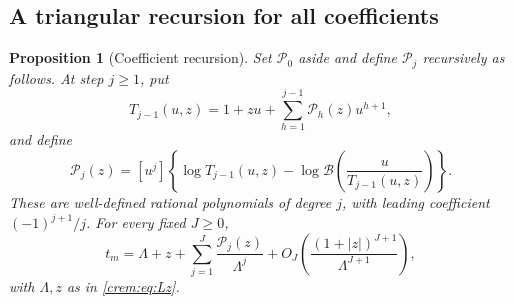 \documentclass[11pt,a4paper]{article}
\newtheorem{proposition}[proposition]{Proposition}
\theoremstyle{definition}\newaliascnt{definition}{theorem}
\theoremstyle{remark}\newaliascnt{remark}{theorem}
\newcommand{\Bformal}{\mathcal B}%
\begin{document}
\subsection{A triangular recursion for all coefficients}
\begin{proposition}[Coefficient recursion]\label{crem:prop:P-recursion}
Set $\mathcal P_0$ aside and define $\mathcal P_j$ recursively as follows.
At step $j\ge1$, put
\[
 T_{j-1}(u,z)=1+zu+\sum_{h=1}^{j-1}\mathcal P_h(z)u^{h+1},
\]
and define
\begin{equation}
 \mathcal P_j(z)=[u^j]\left\{
  \log T_{j-1}(u,z)
  -\log\Bformal\!\left(\frac{u}{T_{j-1}(u,z)}\right)
 \right\}.
 \label{crem:eq:P-recursion}
\end{equation}
These are well-defined rational polynomials of degree $j$, with leading
coefficient $(-1)^{j+1}/j$. For every fixed $J\ge0$,
\begin{equation}
 t_m=\Lambda+z+\sum_{j=1}^{J}\frac{\mathcal P_j(z)}{\Lambda^j}
 +O_J\!\left(\frac{(1+|z|)^{J+1}}{\Lambda^{J+1}}\right),
 \label{crem:eq:t-allorders}
\end{equation}
with $\Lambda,z$ as in \eqref{crem:eq:Lz}.
\end{proposition}
\end{document}
